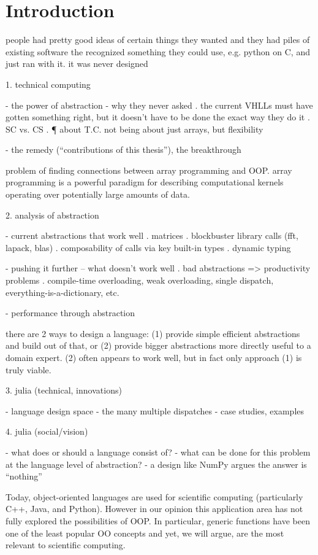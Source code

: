 \chapter{Introduction}

people had pretty good ideas of certain things they wanted
and they had piles of existing software
the recognized something they could use, e.g. python on C, and just ran
with it. it was never designed


1. technical computing

- the power of abstraction
- why they never asked
  . the current VHLLs must have gotten something right, but it doesn't have
    to be done the exact way they do it
  . SC vs. CS
  . ¶ about T.C. not being about just arrays, but flexibility

- the remedy (``contributions of this thesis''), the breakthrough

problem of finding connections between array programming and OOP.
array programming is a powerful paradigm for describing computational
kernels operating over potentially large amounts of data.


2. analysis of abstraction

- current abstractions that work well
  . matrices
  . blockbuster library calls (fft, lapack, blas)
  . composability of calls via key built-in types
  . dynamic typing

- pushing it further -- what doesn't work well
  . bad abstractions => productivity problems
  . compile-time overloading, weak overloading, single dispatch,
    everything-is-a-dictionary, etc.

- performance through abstraction

there are 2 ways to design a language: (1) provide simple efficient abstractions
and build out of that, or (2) provide bigger abstractions more directly useful
to a domain expert. (2) often appears to work well, but in fact only approach
(1) is truly viable.

3. julia (technical, innovations)

- language design space
- the many multiple dispatches
- case studies, examples


4. julia (social/vision)


- what does or should a language consist of?
- what can be done for this problem at the language level of abstraction?
  - a design like NumPy argues the answer is ``nothing''

Today, object-oriented languages are used for scientific computing
(particularly C++, Java, and Python). However in our opinion this
application area has not fully explored the possibilities of OOP. In
particular, generic functions have been one of the least popular
OO concepts and yet, we will argue, are the most relevant to scientific
computing.


